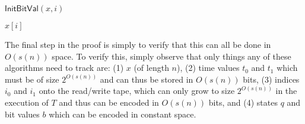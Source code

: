 \documentclass{article}
\begin{document}
\begin{algorithm}{$\mathsf{InitBitVal}(x, i)$}
\begin{algorithmic}
\RETURN $x[i]$
\ELSE
{}
\ENDIF
\end{algorithmic}
\end{algorithm}

The final step in the proof is simply to verify that this can all be done in $O(s(n))$ space.
To verify this, simply observe that only things any of these algorithms need to track are: (1) $x$ (of length $n$), (2) time values $t_0$ and $t_1$ which must be of size $2^{O(s(n))}$ and can thus be stored in $O(s(n))$ bits, (3) indices $i_0$ and $i_1$ onto the read/write tape, which can only grow to size $2^{O(s(n))}$ in the execution of $T$ and thus can be encoded in $O(s(n))$ bits, and (4) states $q$ and bit values $b$ which can be encoded in constant space.





\end{document}
